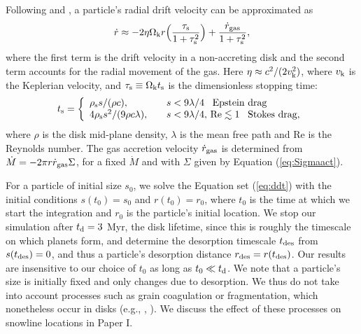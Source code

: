 \documentclass[apj]{emulateapj}
\begin{document}
Following \citet{chiang10} and \citet{birnstiel12}, a particle's radial drift velocity can be approximated as 
\begin{equation}
\label{eq:rdotact}
\dot{r} \approx -2 \eta \Omega_{\rm k} r \Big(\frac{\tau_{\rm s}}{1+\tau_{\rm s}^2}\Big) + \frac{\dot{r}_{\rm gas}}{1+\tau_{\rm s}^2},
\end{equation}
where the first term is the drift velocity in a non-accreting disk and the second term accounts for the radial movement of the gas. Here $\eta \approx c^2/(2 v_{\rm k}^2)$, where $v_{\rm k}$ is the Keplerian velocity, and $\tau_{\rm s} \equiv \Omega_{\rm k} t_{\rm s}$ is the dimensionless stopping time:
\begin{equation}
\label{eq:ts}
t_{\rm s}= \left\{
\begin{array}{l l}
\rho_{\rm s} s / (\rho c), & \quad s < 9 \lambda/4 \,\,\,\ \text{Epstein drag} \\
4 \rho_{\rm s} s^2 / (9 \rho c \lambda), & \quad s < 9 \lambda/4, \,\text{Re} \lesssim 1 \,\,\,\ \text{Stokes drag,}
\end{array} 
\right.
\end{equation}
where $\rho$ is the disk mid-plane density, $\lambda$ is the mean free path and Re is the Reynolds number.  The gas accretion velocity $\dot{r}_{\rm gas}$ is determined from $\dot{M}=-2 \pi r \dot{r}_{\rm gas} \Sigma$, for a fixed $\dot{M}$ and with $\Sigma$ given by Equation (\ref{eq:Sigmaact}). 

For a particle of initial size $s_0$, we solve the Equation set (\ref{eq:ddt}) with the initial conditions $s(t_0)=s_0$ and $r(t_0)=r_0$, where $t_0$ is the time at which we start the integration and $r_0$ is the particle's initial location. We stop our simulation after $t_{\rm d}=3$ Myr, the disk lifetime, since this is roughly the timescale on which planets form, and determine the desorption timescale $t_{\rm des}$ from $s(t_{\rm des})=0$, and thus a particle's desorption distance $r_{\rm des}=r(t_{\rm des})$. Our results are insensitive to our choice of $t_0$ as long as $t_0 \ll t_{\rm d}$. We note that a particle's size is initially fixed and only changes due to desorption. We thus do not take into account processes such as grain coagulation or fragmentation, which nonetheless occur in disks (e.g., \citealt{birnstiel12}, \citealt{perez12}). We discuss the effect of these processes on snowline locations in Paper I.
\end{document}
